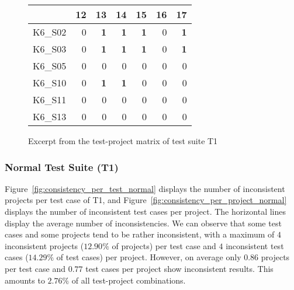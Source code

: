 \begin{figure}[htpb]
    \centering

    \setlength{\tabcolsep}{0.2em}
    \tiny
    \begin{tabular}{l|rrrrrr}
        \toprule
                & 12         & 13         & 14         & 15         & 16         & 17         \\
        \midrule
        K6\_S02 & 0          & \textbf{1} & \textbf{1} & \textbf{1} & 0          & \textbf{1} \\
        K6\_S03 & 0          & \textbf{1} & \textbf{1} & \textbf{1} & 0          & \textbf{1} \\
        K6\_S05 & 0          & 0          & 0          & 0          & 0          & 0          \\
        K6\_S10 & 0          & \textbf{1} & \textbf{1} & 0          & 0          & 0          \\
        K6\_S11 & 0          & 0          & 0          & 0          & 0          & 0          \\
        K6\_S13 & 0          & 0          & 0          & 0          & 0          & 0          \\
        \bottomrule
    \end{tabular}
    \setlength{\tabcolsep}{\defaulttabcolsep}

    \caption{Excerpt from the test-project matrix of test suite T1}
    \label{tab:inconsistency_matrices_excerpt}
\end{figure}

\subsubsection{Normal Test Suite (T1)}

\noindent Figure~\ref{fig:consistency_per_test_normal} displays the number of inconsistent projects per test case of T1,
and Figure~\ref{fig:consistency_per_project_normal} displays the number of inconsistent test cases per project.
The horizontal lines display the average number of inconsistencies.
We can observe that some test cases and some projects tend to be rather inconsistent,
with a maximum of $4$ inconsistent projects ($12.90\%$ of projects) per test case and $4$ inconsistent test cases ($14.29\%$ of test cases) per project.
However, on average only $0.86$ projects per test case and $0.77$ test cases per project show inconsistent results.
This amounts to $2.76\%$ of all test-project combinations.

